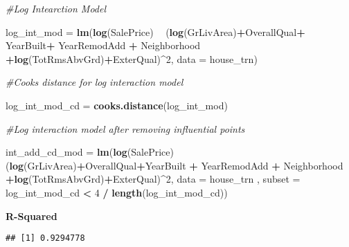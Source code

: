 \documentclass[]{article}
\newenvironment{Shaded}{\begin{snugshade}}{\end{snugshade}}
\newcommand{\KeywordTok}[1]{\textcolor[rgb]{0.13,0.29,0.53}{\textbf{#1}}}
\newcommand{\DataTypeTok}[1]{\textcolor[rgb]{0.13,0.29,0.53}{#1}}
\newcommand{\DecValTok}[1]{\textcolor[rgb]{0.00,0.00,0.81}{#1}}
\newcommand{\StringTok}[1]{\textcolor[rgb]{0.31,0.60,0.02}{#1}}
\newcommand{\CommentTok}[1]{\textcolor[rgb]{0.56,0.35,0.01}{\textit{#1}}}
\newcommand{\OperatorTok}[1]{\textcolor[rgb]{0.81,0.36,0.00}{\textbf{#1}}}
\newcommand{\NormalTok}[1]{#1}
\begin{document}
\begin{Shaded}
\begin{Highlighting}[]
\CommentTok{#Log Intearction Model}

\NormalTok{log_int_mod =}\StringTok{ }\KeywordTok{lm}\NormalTok{(}\KeywordTok{log}\NormalTok{(SalePrice) }\OperatorTok{~}\StringTok{  }\NormalTok{(}\KeywordTok{log}\NormalTok{(GrLivArea)}\OperatorTok{+}\NormalTok{OverallQual}\OperatorTok{+}\StringTok{ }\NormalTok{YearBuilt}\OperatorTok{+}\StringTok{ }\NormalTok{YearRemodAdd }\OperatorTok{+}\StringTok{ }\NormalTok{Neighborhood }\OperatorTok{+}\KeywordTok{log}\NormalTok{(TotRmsAbvGrd)}\OperatorTok{+}\NormalTok{ExterQual)}\OperatorTok{^}\DecValTok{2}\NormalTok{, }\DataTypeTok{data =}\NormalTok{ house_trn)}

\CommentTok{#Cooks distance for log interaction model}

\NormalTok{log_int_mod_cd =}\StringTok{ }\KeywordTok{cooks.distance}\NormalTok{(log_int_mod)}

\CommentTok{#Log interaction model after removing influential points}
   
\NormalTok{ int_add_cd_mod =}\StringTok{ }\KeywordTok{lm}\NormalTok{(}\KeywordTok{log}\NormalTok{(SalePrice) }\OperatorTok{~}\StringTok{  }\NormalTok{(}\KeywordTok{log}\NormalTok{(GrLivArea)}\OperatorTok{+}\NormalTok{OverallQual}\OperatorTok{+}\NormalTok{YearBuilt }\OperatorTok{+}\StringTok{ }\NormalTok{YearRemodAdd }\OperatorTok{+}\StringTok{ }\NormalTok{Neighborhood }\OperatorTok{+}\KeywordTok{log}\NormalTok{(TotRmsAbvGrd)}\OperatorTok{+}\NormalTok{ExterQual)}\OperatorTok{^}\DecValTok{2}\NormalTok{, }\DataTypeTok{data =}\NormalTok{ house_trn  , }\DataTypeTok{subset =}\NormalTok{ log_int_mod_cd }\OperatorTok{<}\StringTok{ }\DecValTok{4} \OperatorTok{/}\StringTok{ }\KeywordTok{length}\NormalTok{(log_int_mod_cd))}
\end{Highlighting}
\end{Shaded}

\textbf{R-Squared}

\begin{Shaded}
\end{Shaded}

\begin{verbatim}
## [1] 0.9294778
\end{verbatim}
\end{document}
